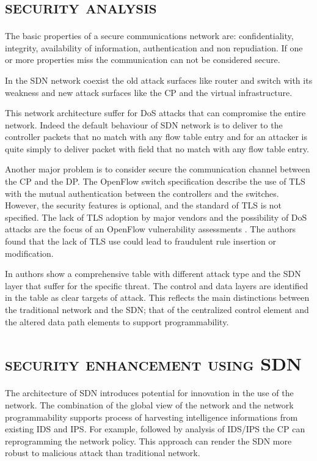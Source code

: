%
\section*{\small \textsc{security analysis}}
The basic properties of a secure communications network are: confidentiality, integrity, availability of information, authentication and non repudiation. If one or more properties miss the communication can not be considered secure.

In the \ac{SDN} network coexist the old attack surfaces like router and switch with its weakness and new attack surfaces like the \ac{CP} and the virtual infrastructure.

This network architecture suffer for \ac{DoS} attacks that can compromise the entire network. Indeed the default behaviour of \ac{SDN} network is to deliver to the controller packets that no match with any flow table entry and for an attacker is quite simply to deliver packet with field that no match with any flow table entry.

Another major problem is to consider secure the communication channel between the 	\ac{CP} and the \ac{DP}. The OpenFlow switch specification \cite{onf:openflow-specifications} describe the use of \ac{TLS} with the mutual authentication between the controllers and the switches. However, the security features is optional, and the standard of \ac{TLS} is not specified. The lack of \ac{TLS} adoption by major vendors and the possibility of \ac{DoS} attacks are the focus of an OpenFlow vulnerability assessments \cite{acm:openflow-vulnerability}. The authors found that the lack of \ac{TLS} use could lead to fraudulent rule insertion or modification.

In \cite{sdn-openflow-security} authors show a comprehensive table with different attack type and the \ac{SDN} layer that suffer for the specific threat. The control and data layers are identified in the table as clear targets of attack. This reflects the main distinctions between the traditional network and the \ac{SDN}; that of the centralized control element and the altered data path elements to support programmability.

\section*{\small \textsc{security enhancement using \ac{SDN}}}
The architecture of \ac{SDN} introduces potential for innovation in the use of the network. The combination of the global view of the network and the network programmability supports process of harvesting intelligence informations from existing \ac{IDS} and \ac{IPS}. For example, followed by analysis of \ac{IDS}/\ac{IPS} the \ac{CP} can reprogramming the network policy. This approach can render the \ac{SDN} more robust to malicious attack than traditional network.

